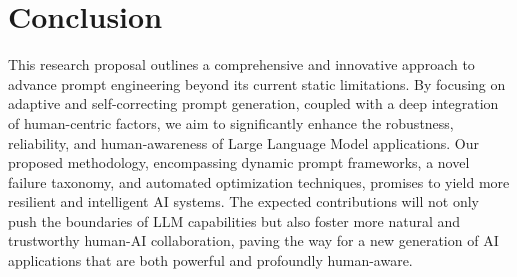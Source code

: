 \documentclass{article}
\begin{document}
\section{Conclusion}
This research proposal outlines a comprehensive and innovative approach to advance prompt engineering beyond its current static limitations. By focusing on adaptive and self-correcting prompt generation, coupled with a deep integration of human-centric factors, we aim to significantly enhance the robustness, reliability, and human-awareness of Large Language Model applications. Our proposed methodology, encompassing dynamic prompt frameworks, a novel failure taxonomy, and automated optimization techniques, promises to yield more resilient and intelligent AI systems. The expected contributions will not only push the boundaries of LLM capabilities but also foster more natural and trustworthy human-AI collaboration, paving the way for a new generation of AI applications that are both powerful and profoundly human-aware.



\end{document}
